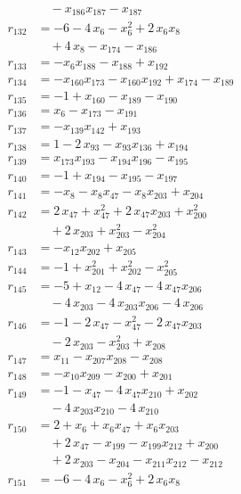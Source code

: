 \begin{align*}
&\quad{}- x_{186} x_{187} - x_{187} \\
r_{132} &= -6 - 4\,x_{6} - x_{6}^{2} + 2\,x_{6} x_{8} \\
&\quad{}+ 4\,x_{8} - x_{174} - x_{186} \\
r_{133} &= -x_{6} x_{188} - x_{188} + x_{192} \\
r_{134} &= -x_{160} x_{173} - x_{160} x_{192} + x_{174} - x_{189} \\
r_{135} &= -1 + x_{160} - x_{189} - x_{190} \\
r_{136} &= x_{6} - x_{173} - x_{191} \\
r_{137} &= -x_{139} x_{142} + x_{193} \\
r_{138} &= 1 - 2\,x_{93} - x_{93} x_{136} + x_{194} \\
r_{139} &= x_{173} x_{193} - x_{194} x_{196} - x_{195} \\
r_{140} &= -1 + x_{194} - x_{195} - x_{197} \\
r_{141} &= -x_{8} - x_{8} x_{47} - x_{8} x_{203} + x_{204} \\
r_{142} &= 2\,x_{47} + x_{47}^{2} + 2\,x_{47} x_{203} + x_{200}^{2} \\
&\quad{}+ 2\,x_{203} + x_{203}^{2} - x_{204}^{2} \\
r_{143} &= -x_{12} x_{202} + x_{205} \\
r_{144} &= -1 + x_{201}^{2} + x_{202}^{2} - x_{205}^{2} \\
r_{145} &= -5 + x_{12} - 4\,x_{47} - 4\,x_{47} x_{206} \\
&\quad{}- 4\,x_{203} - 4\,x_{203} x_{206} - 4\,x_{206} \\
r_{146} &= -1 - 2\,x_{47} - x_{47}^{2} - 2\,x_{47} x_{203} \\
&\quad{}- 2\,x_{203} - x_{203}^{2} + x_{208} \\
r_{147} &= x_{11} - x_{207} x_{208} - x_{208} \\
r_{148} &= -x_{10} x_{209} - x_{200} + x_{201} \\
r_{149} &= -1 - x_{47} - 4\,x_{47} x_{210} + x_{202} \\
&\quad{}- 4\,x_{203} x_{210} - 4\,x_{210} \\
r_{150} &= 2 + x_{6} + x_{6} x_{47} + x_{6} x_{203} \\
&\quad{}+ 2\,x_{47} - x_{199} - x_{199} x_{212} + x_{200} \\
&\quad{}+ 2\,x_{203} - x_{204} - x_{211} x_{212} - x_{212} \\
r_{151} &= -6 - 4\,x_{6} - x_{6}^{2} + 2\,x_{6} x_{8} \\

\end{align*}

